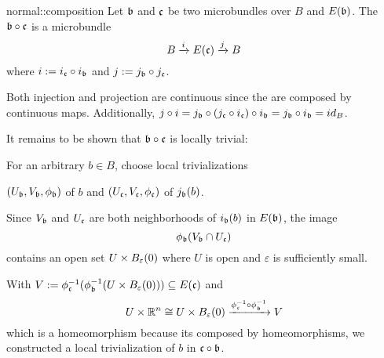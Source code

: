 \begin{mydefinition}{normal::composition}
    Let $\bb$ and $\bc$ be two microbundles over $B$ and $E(\bb)$.
    The  $\bb \circ \bc$ is a microbundle
    \[ \bundle{B}{E(\bc)}{i}{j} \]
    where $i := i_\bc \circ i_\bb$ and $j := j_\bb \circ j_\bc$.
\end{mydefinition}

\begin{myproof}
    Both injection and projection are continuous since the are composed by continuous maps.
    Additionally, $j \circ i = j_\bb \circ (j_\bc \circ i_\bc) \circ i_\bb = j_\bb \circ i_\bb = id_B$.

    It remains to be shown that $\bb \circ \bc$ is locally trivial:

    For an arbitrary $b \in B$, choose local trivializations
    \begin{center}
        $(U_\bb, V_\bb, \phi_\bb)$ of $b$ and $(U_\bc, V_\bc, \phi_\bc)$ of $j_\bb(b)$.
    \end{center}
    Since $V_\bb$ and $U_\bc$ are both neighborhoods of $i_\bb(b)$ in $E(\bb)$, the image
    \[ \phi_\bb(V_\bb \cap U_\bc) \]
    contains an open set $U \times \ball[\varepsilon]$ where $U$ is open and $\varepsilon$ is sufficiently small.

    With $V := \phi_\bc^{-1}(\phi_\bb^{-1}(U \times \ball[\varepsilon])) \sub E(\bc)$ and
    \[ U \times \R^n \cong U \times \ball[\varepsilon] \xto{\inv{\phi_\bc} \circ \inv{\phi_\bb}} V \]
    which is a homeomorphism because its composed by homeomorphisms, we constructed a local trivialization of $b$ in $\bc \circ \bb$.
\end{myproof}